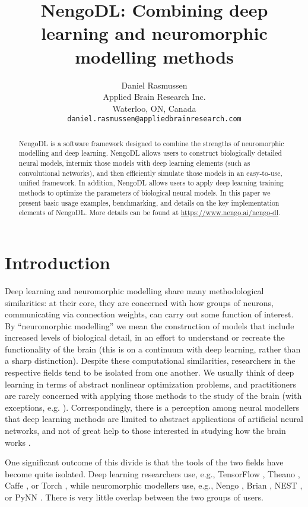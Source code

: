 \documentclass{article}
\title{NengoDL: Combining deep learning and neuromorphic modelling methods}
\author{
Daniel Rasmussen \\
Applied Brain Research Inc.\\
Waterloo, ON, Canada \\
\texttt{daniel.rasmussen@appliedbrainresearch.com}
}
\begin{document}
\maketitle

\begin{abstract}
NengoDL is a software framework designed to combine the strengths of neuromorphic modelling and deep learning.  NengoDL allows users to construct biologically detailed neural models, intermix those models with deep learning elements (such as convolutional networks), and then efficiently simulate those models in an easy-to-use, unified framework.  In addition, NengoDL allows users to apply deep learning training methods to optimize the parameters of biological neural models.  In this paper we present basic usage examples, benchmarking, and details on the key implementation elements of NengoDL.  More details can be found at \url{https://www.nengo.ai/nengo-dl}.
\end{abstract}

\section{Introduction}

Deep learning and neuromorphic modelling share many methodological similarities: at their core, they are concerned with how groups of neurons, communicating via connection weights, can carry out some function of interest.  By ``neuromorphic modelling'' we mean the construction of models that include increased levels of biological detail, in an effort to understand or recreate the functionality of the brain (this is on a continuum with deep learning, rather than a sharp distinction).  Despite these computational similarities, researchers in the respective fields tend to be isolated from one another.  We usually think of deep learning in terms of abstract nonlinear optimization problems, and practitioners are rarely concerned with applying those methods to the study of the brain (with exceptions, e.g. \citet{Kriegeskorte2015,Yamins2016}).  Correspondingly, there is a perception among neural modellers that deep learning methods are limited to abstract applications of artificial neural networks, and not of great help to those interested in studying how the brain works \citep{Kay2017}.

One significant outcome of this divide is that the tools of the two fields have become quite isolated.  Deep learning researchers use, e.g., TensorFlow \citep{Abadi2016}, Theano \citep{Team2016}, Caffe \citep{Jia2014}, or Torch \citep{Collobert2011}, while neuromorphic modellers use, e.g., Nengo \citep{Bekolay2014}, Brian \citep{Stimberg2013}, NEST \citep{Gewaltig2007}, or PyNN \citep{Davison2009}. There is very little overlap between the two groups of users.
\end{document}
